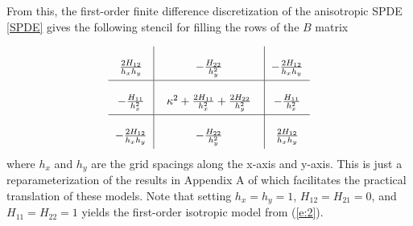 \documentclass[review]{elsarticle}
\begin{document}
From this, the first-order finite difference discretization of the anisotropic SPDE \ref{SPDE} gives the following stencil for filling the rows of the $B$ matrix

\begin{equation}
\label{e:3}
       \arraycolsep=6.0pt\def\arraystretch{2.5}
   \begin{array}{c|c|c}
      \frac{2H_{12}}{h_x h_y} & -\frac{H_{22}}{h_y^2} & -\frac{2H_{12}}{h_x h_y} \\
        \hline
      -\frac{H_{11}}{h_x^2} & \;\; \kappa^2 + \frac{2H_{11}}{h_x^2} + \frac{2H_{22}}{h_y^2} \;\; & -\frac{H_{11}}{h_x^2} \\
      \hline
      -\frac{2H_{12}}{h_x h_y} & -\frac{H_{22}}{h_y^2} & \frac{2H_{12}}{h_x h_y} \\
    \end{array} 
\end{equation}
where $h_x$ and $h_y$ are the grid spacings along the x-axis and y-axis. This is just a reparameterization of the results in Appendix A of \cite{lindgren2011explicit} which facilitates the practical translation of these models. Note that setting $h_x = h_y =1$, $H_{12} = H_{21} =0$, and $H_{11} = H_{22} = 1$ yields the first-order isotropic model from (\ref{e:2}).

\end{document}
